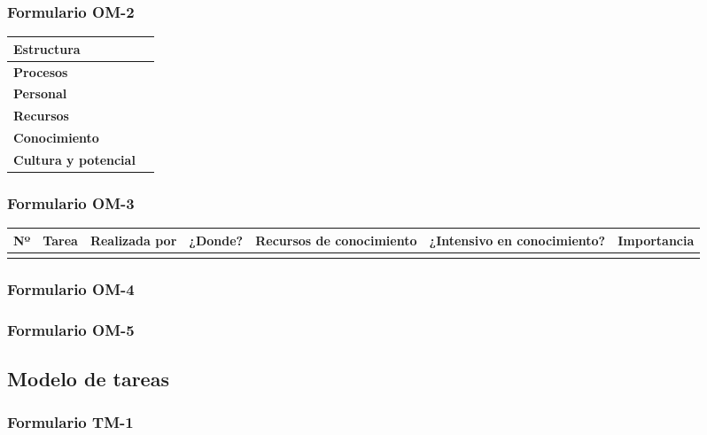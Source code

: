 \documentclass[a4paper,11pt]{article}
\begin{document}
			\subsubsection{Formulario OM-2}
			\begin{center}
				\begin{tabular}{| l | l |}
					\hline
					\textbf{Estructura} & \\
					\hline
					\textbf{Procesos} & \\
					\hline
					\textbf{Personal} & \\
					\hline
					\textbf{Recursos} & \\
					\hline
					\textbf{Conocimiento} & \\
					\hline
					\textbf{Cultura y potencial} & \\
					\hline
				\end{tabular}
			\end{center}
			\newpage
			\begin{landscape}
			\subsubsection{Formulario OM-3}
			\begin{center}
				\begin{tabular}{| l | l | l | l | l | l | l |}
					\hline
					\textbf{Nº} & \textbf{Tarea} & \textbf{Realizada por} & \textbf{¿Donde?} & \textbf{Recursos de conocimiento} &
					\textbf{¿Intensivo en conocimiento?} & \textbf{Importancia}\\
					\hline
					 & & & & & &\\
					\hline
				\end{tabular}
			\end{center}
			\end{landscape}
			\newpage
			\subsubsection{Formulario OM-4}
			\subsubsection{Formulario OM-5}
		\subsection{Modelo de tareas}
			\subsubsection{Formulario TM-1}
\end{document}
